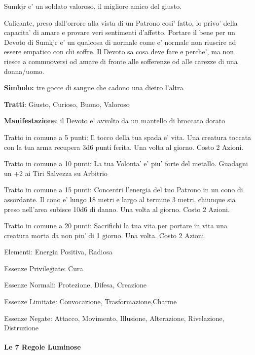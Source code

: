 \documentclass[a4paper,11pt,twoside,openany]{dndbook}
\begin{document}
{Sumkjr e' un soldato valoroso, il migliore amico del giusto.

Calicante, preso dall'orrore alla vista di un Patrono cosi' fatto, lo privo' della capacita' di amare e provare veri sentimenti d'affetto. Portare il bene per un Devoto di Sumkjr e' un qualcosa di normale come e' normale non riuscire ad essere empatico con chi soffre. Il Devoto sa cosa deve fare e perche', ma non riesce a commuoversi od amare di fronte alle sofferenze od alle carezze di una donna/uomo.

\textbf{Simbolo:} tre gocce di sangue che cadono una dietro l'altra

\textbf{Tratti}: Giusto, Curioso, Buono, Valoroso

\textbf{Manifestazione}: il Devoto e' avvolto da un mantello di broccato dorato

\bigskip

Tratto in comune a 5 punti: Il tocco della tua spada e’ vita. Una creatura toccata con la tua arma recupera 3d6 punti ferita. Una volta al giorno. Costo 2 Azioni. 

Tratto in comune a 10 punti: La tua Volonta’ e’ piu’ forte del metallo. Guadagni un +2 ai Tiri Salvezza su Arbitrio

Tratto in comune a 15 punti: Concentri l’energia del tuo Patrono in un cono di assordante. Il cono e’ lungo 18 metri e largo al termine 3 metri, chiunque sia preso nell’area subisce 10d6 di danno. 
Una volta al giorno. Costo 2 Azioni.

Tratto in comune a 20 punti: Sacrifichi la tua vita per portare in vita una creatura morta da non piu’ di 1 giorno. Una volta. Costo 2 Azioni.

\bigskip

Elementi: Energia Positiva, Radiosa

\bigskip

Essenze Privilegiate: Cura

Essenze Normali: Protezione, Difesa, Creazione

Essenze Limitate: Convocazione, Trasformazione,Charme

Essenze Negate: Attacco, Movimento, Illusione, Alterazione, Rivelazione, Distruzione

\bigskip

\paragraph{Le 7 Regole Luminose}

}
\end{document}
